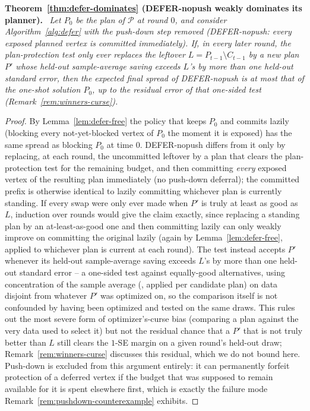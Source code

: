 \documentclass[11pt]{article}
\theoremstyle{definition}
\theoremstyle{remark}
\newenvironment{repeattheorem}[1][]{\par\medskip\noindent\textbf{#1.}\ \itshape}{\par\medskip}
\begin{document}
\begin{repeattheorem}[Theorem~\ref{thm:defer-dominates} (DEFER-nopush weakly dominates its planner)]
Let $P_0$ be the plan of $\mathcal P$ at round $0$, and consider
Algorithm~\ref{alg:defer} with the push-down step removed
(DEFER-nopush: every exposed planned vertex is committed
immediately). If, in every later round, the plan-protection test only ever
replaces the leftover $L=P_{t-1}\setminus C_{t-1}$ by a new plan $P'$
whose held-out sample-average saving exceeds $L$'s by more than one
held-out standard error, then the expected final spread of
DEFER-nopush is at most that of the one-shot solution $P_0$, up to
the residual error of that one-sided test (Remark~\ref{rem:winners-curse}).
\end{repeattheorem}
\begin{proof}
By Lemma~\ref{lem:defer-free} the policy that keeps $P_0$ and commits
lazily (blocking every not-yet-blocked vertex of $P_0$ the moment it is
exposed) has the same spread as blocking $P_0$ at time $0$.
DEFER-nopush differs from it only by replacing, at each round,
the uncommitted leftover by a plan that clears the plan-protection test
for the remaining budget, and then committing \emph{every} exposed vertex
of the resulting plan immediately (no push-down deferral); the committed
prefix is otherwise identical to lazily committing whichever plan is
currently standing. If every swap were only ever made when $P'$ is truly
at least as good as $L$, induction over rounds would give the claim
exactly, since replacing a standing plan by an at-least-as-good one and
then committing lazily can only weakly improve on committing the original
lazily (again by Lemma~\ref{lem:defer-free}, applied to whichever plan is
current at each round). The test instead accepts $P'$ whenever its
held-out sample-average saving exceeds $L$'s by more than one held-out
standard error -- a one-sided test against equally-good alternatives,
using concentration of the sample average (\citealp{xie2024}, applied per
candidate plan) on data disjoint from whatever $P'$ was optimized on, so
the comparison itself is not confounded by having been optimized and
tested on the same draws. This rules out the most severe form of
optimizer's-curse bias (comparing a plan against the very data used to
select it) but not the residual chance that a $P'$ that is not truly
better than $L$ still clears the $1$-SE margin on a given round's held-out
draw; Remark~\ref{rem:winners-curse} discusses this residual, which we do
not bound here. Push-down is excluded from this argument entirely: it can
permanently forfeit protection of a deferred vertex if the budget that was
supposed to remain available for it is spent elsewhere first, which is
exactly the failure mode Remark~\ref{rem:pushdown-counterexample}
exhibits.
\end{proof}
\end{document}
